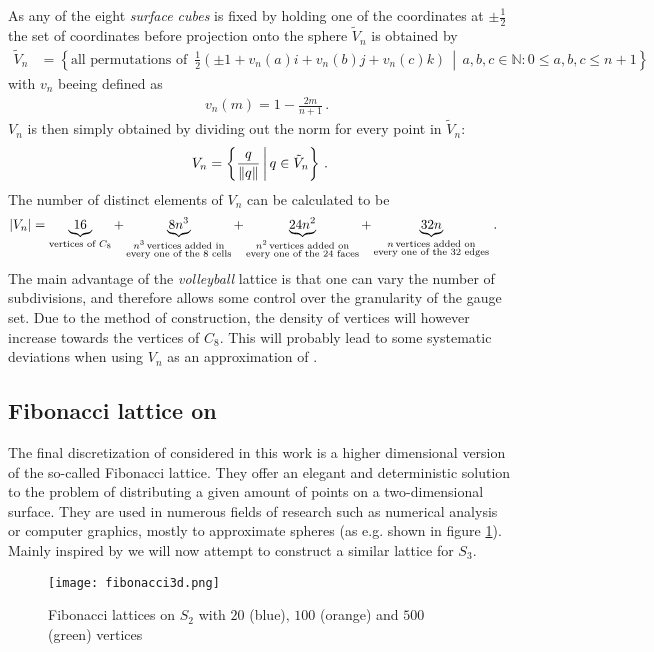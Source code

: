 As any of the eight \emph{surface cubes} is fixed by holding one of the coordinates at $\pm \frac{1}{2}$ the set of coordinates before projection onto the sphere $\tilde{V}_n$ is obtained by
\begin{align*}
 \tilde{V}_n & = \left\{ \textrm{all permutations of }  \, \frac{1}{2} \left( \pm 1 + v_n(a) i + v_n(b) j + v_n(c) k \right)  \, \middle| \, a,b,c \in \mathbb{N}: 0 \le a,b,c \le n+1 \right\}
\end{align*}
with $v_n$ beeing defined as
\begin{align*}
 \quad v_n(m)  =  1-\frac{2m}{n+1} \, \textrm{.}
\end{align*}
$V_n$ is then simply obtained by dividing out the norm for every point in $\tilde{V}_n$:
\begin{align*}
 V_n = \left\{\frac{q}{\norm{q}} \, \middle| \,  q \in \tilde{V}_n \right\} \, \textrm{.}
\end{align*}
The number of distinct elements of $V_n$ can be calculated to be
\begin{align*}
 \abs{V_n} & = \underbrace{16}_{\substack{ \textrm{vertices of } C_8
 }} + \underbrace{8 n^3}_{\substack{n^3 \, \textrm{vertices added in} \\ \textrm{every one of the 8 cells}}} + \underbrace{24 n^2}_{\substack{n^2 \, \textrm{vertices added on} \\ \textrm{every one of the 24 faces}}} + \underbrace{32 n}_{\substack{n \, \textrm{vertices added on} \\ \textrm{every one of the 32 edges}}} \, \textrm{.}
\end{align*}
The main advantage of the \emph{volleyball} lattice is that one can vary the number of subdivisions, and therefore allows some control over the granularity of the gauge set. Due to the method of construction, the density of vertices will however increase towards the vertices of $C_8$. This will probably lead to some systematic deviations when using $V_n$ as an approximation of \SUTwo.

\subsection{Fibonacci lattice on \SUTwo}

The final discretization of \SUTwo considered in this work is a higher dimensional version of the so-called Fibonacci lattice. They offer an elegant and deterministic solution to the problem of distributing a given amount of points on a two-dimensional surface. They are used in numerous fields of research such as numerical analysis or computer graphics, mostly to approximate spheres (as e.g. shown in figure \ref{fig:fibonacciPic}). Mainly inspired by \cite{stack:fibonacci} we will now attempt to construct a similar lattice for $S_3$.\\
\begin{figure}
 \centering
 \texttt{[image: fibonacci3d.png]}
 \caption{Fibonacci lattices on $S_2$ with $20$ (blue), $100$ (orange) and $500$ (green) vertices}
 \label{fig:fibonacciPic}
\end{figure}

